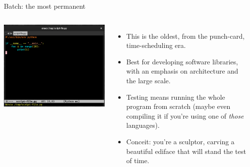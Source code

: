 \documentclass[aspectratio=169]{beamer}
\begin{document}
\begin{frame}{Batch: the most permanent}
\vspace{0.2 cm}
\begin{columns}
\includegraphics[width=\linewidth]{../img/fundamental-3-modes-batch.png}

\large
\begin{itemize}\setlength{\itemsep}{0.25 cm}
\item<1-> This is the oldest, from the punch-card, time-scheduling era.
\item<2-> Best for developing software libraries, with an emphasis on architecture and the large scale.
\item<3-> Testing means running the whole program from scratch (maybe even compiling it if you're using one of {\it those} languages).
\item<4-> Conceit: you're a sculptor, carving a beautiful ediface that will stand the test of time.
\end{itemize}
\end{columns}
\end{frame}
\end{document}
